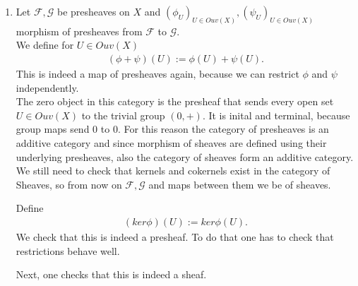 \begin{exercise}{3}
    \begin{enumerate}
        \item{Let $\mathcal{F}, \mathcal{G}$ be presheaves on $X$ and
            $(\phi_U)_{U\in Ouv(X)}, (\psi_U)_{U\in Ouv(X)}$ morphism of
            presheaves from $\mathcal{F}$ to $\mathcal{G}$.\\ We define for
            $U\in Ouv(X)$
            \begin{align*}
                (\phi+\psi)(U):=\phi(U)+\psi(U).
            \end{align*}
            This is indeed a map of presheaves again, because we can restrict
            $\phi$ and $\psi$ independently.\\ The zero object in this category
            is the presheaf that sends every open set $U\in Ouv(X)$ to the
            trivial group $(0,+)$. It is inital and terminal, because group maps
            send $0$ to $0$. For this reason the category of presheaves is an
            additive category and since morphism of sheaves are defined using
            their underlying presheaves, also the category of sheaves form an
            additive category.\\ We still need to check that kernels and
            cokernels exist in the category of Sheaves, so from now on
            $\mathcal{F},\mathcal{G}$ and maps between them we be of sheaves.

            Define 
            \begin{align*}
                (ker\phi)(U):=ker\phi(U).
            \end{align*}
            We check that this is indeed a presheaf. To do that one has to check
            that restrictions behave well.

            Next, one checks that this is indeed a sheaf.

}
\end{enumerate}
\end{exercise}

